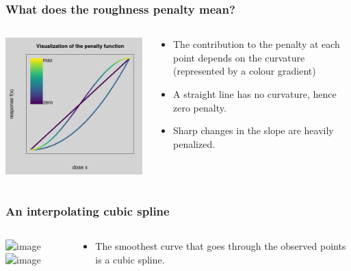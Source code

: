 \documentclass{beamer}
\begin{document}
\begin{frame}
  \frametitle{What does the roughness penalty mean?}

   \begin{columns}
    \begin{column}{5cm}
      \includegraphics[scale=0.4]{figures/penalty2.png}
    \end{column}
    \begin{column}{4cm}
      \begin{itemize}
      \item The contribution to the penalty at each point depends on the
        curvature (represented by a colour gradient)
      \item A straight line has no curvature, hence zero penalty.
      \item Sharp changes in the slope are heavily penalized.
      \end{itemize}
    \end{column}
  \end{columns}

\end{frame}
    
\begin{frame}
  \frametitle{An interpolating cubic spline}

    \begin{columns}
    \begin{column}{5cm}
      \includegraphics<1>[scale=0.4]{figures/dose-response-points.png}
      \includegraphics<2>[scale=0.4]{figures/dose-response-cubic.png}
    \end{column}
    \begin{column}{4cm}
      \begin{itemize}
        \item The smoothest curve that goes through the observed
          points is a cubic spline.
      \end{itemize}
    \end{column}
  \end{columns}

\end{frame}
\end{document}
